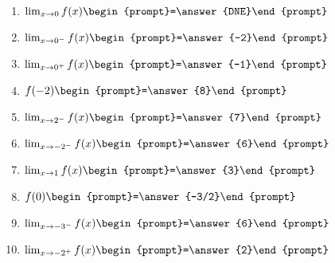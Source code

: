 \documentclass{ximera}
\begin{document}
\begin{question}
\begin{enumerate}
\item $\lim_{x\to 0} f(x) \begin{prompt}=\answer{DNE}\end{prompt}$ 
\item $\lim_{x\to 0^-} f(x) \begin{prompt}=\answer{-2}\end{prompt}$  
\item $\lim_{x\to 0^+} f(x) \begin{prompt}=\answer{-1}\end{prompt}$  
\item $f(-2) \begin{prompt}=\answer{8}\end{prompt}$  
\item $\lim_{x\to 2^-} f(x) \begin{prompt}=\answer{7}\end{prompt}$  
\item $\lim_{x\to -2^-} f(x) \begin{prompt}=\answer{6}\end{prompt}$  
\item $\lim_{x\to 1} f(x) \begin{prompt}=\answer{3}\end{prompt}$  
\item $f(0) \begin{prompt}=\answer{-3/2}\end{prompt}$ 
\item $\lim_{x\to -3^-} f(x) \begin{prompt}=\answer{6}\end{prompt}$  
\item $\lim_{x\to -2^+} f(x) \begin{prompt}=\answer{2}\end{prompt}$
\end{enumerate}
\end{question}
\end{document}
